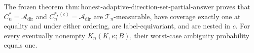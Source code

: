 The frozen theorem \(\mathrm{thm{:}honest\text{-}adaptive\text{-}direction\text{-}set\text{-}partial\text{-}answer}\) proves that \(C_n^*=\mathcal A_{\mathrm{dir}}\) and \(C_n^{*,(c)}=\mathcal A_{\mathrm{dir}}\) are \(\mathcal T_n\)-measurable, have coverage exactly one at equality and under either ordering, are label-equivariant, and are nested in \(c\). For every eventually nonempty \(K_n(K,\kappa;B)\), their worst-case ambiguity probability equals one.